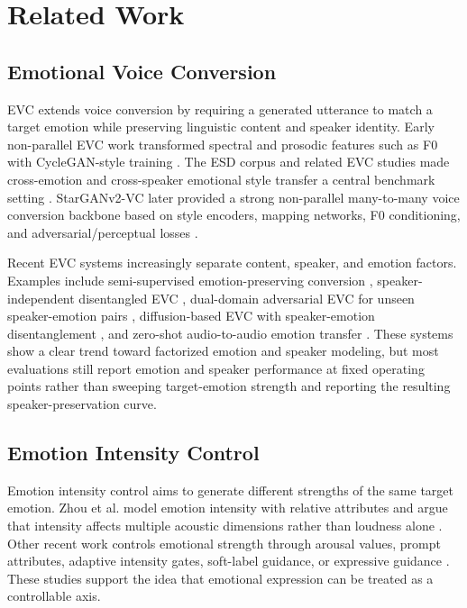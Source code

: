 \section{Related Work}
\label{sec:related-work}

\subsection{Emotional Voice Conversion}
EVC extends voice conversion by requiring a generated utterance to match a target emotion while preserving linguistic content and speaker identity.
Early non-parallel EVC work transformed spectral and prosodic features such as F0 with CycleGAN-style training \cite{zhou2020transforming}.
The ESD corpus and related EVC studies made cross-emotion and cross-speaker emotional style transfer a central benchmark setting \cite{zhou2021seen,zhou2022evctheoryesd}.
StarGANv2-VC later provided a strong non-parallel many-to-many voice conversion backbone based on style encoders, mapping networks, F0 conditioning, and adversarial/perceptual losses \cite{li2021starganv2vc}.

Recent EVC systems increasingly separate content, speaker, and emotion factors.
Examples include semi-supervised emotion-preserving conversion \cite{ghosh2023emostargan}, speaker-independent disentangled EVC \cite{chen2022sievc}, dual-domain adversarial EVC for unseen speaker-emotion pairs \cite{shah2023evcusep}, diffusion-based EVC with speaker-emotion disentanglement \cite{chou2024diffevc}, and zero-shot audio-to-audio emotion transfer \cite{dutta2024zest}.
These systems show a clear trend toward factorized emotion and speaker modeling, but most evaluations still report emotion and speaker performance at fixed operating points rather than sweeping target-emotion strength and reporting the resulting speaker-preservation curve.

\subsection{Emotion Intensity Control}
Emotion intensity control aims to generate different strengths of the same target emotion.
Zhou et al. model emotion intensity with relative attributes and argue that intensity affects multiple acoustic dimensions rather than loudness alone \cite{zhou2023emotionintensity}.
Other recent work controls emotional strength through arousal values, prompt attributes, adaptive intensity gates, soft-label guidance, or expressive guidance \cite{prabhu2023inthewildsec,qi2024einet,pan2025clapfmevc,guo2023emodiff,chou2024diffevc}.
These studies support the idea that emotional expression can be treated as a controllable axis.

